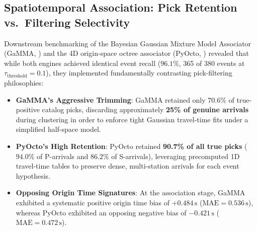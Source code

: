 \subsection{Spatiotemporal Association: Pick Retention vs.\ Filtering Selectivity}
Downstream benchmarking of the Bayesian Gaussian Mixture Model Associator (\ac{GaMMA}, \cite{GaMMA}) and the 4D origin-space octree associator (\ac{PyOcto}, \cite{PyOcto}) revealed that while both engines achieved identical event recall ($96.1\%$, 365 of 380 events at $\tau_{\mathrm{threshold}} = 0.1$), they implemented fundamentally contrasting pick-filtering philosophies:
\begin{itemize}
  \item \textbf{GaMMA's Aggressive Trimming}: GaMMA retained only $70.6\%$ of true-positive catalog picks, discarding approximately \textbf{25\% of genuine arrivals} during clustering in order to enforce tight Gaussian travel-time fits under a simplified half-space model.
  \item \textbf{PyOcto's High Retention}: PyOcto retained \textbf{90.7\% of all true picks} ($94.0\%$ of P-arrivals and $86.2\%$ of S-arrivals), leveraging precomputed 1D travel-time tables to preserve dense, multi-station arrivals for each event hypothesis.
  \item \textbf{Opposing Origin Time Signatures}: At the association stage, GaMMA exhibited a systematic positive origin time bias of $+0.484\,\unit{\second}$ ($\mathrm{MAE} = 0.536\,\unit{\second}$), whereas PyOcto exhibited an opposing negative bias of $-0.421\,\unit{\second}$ ($\mathrm{MAE} = 0.472\,\unit{\second}$).
\end{itemize}

